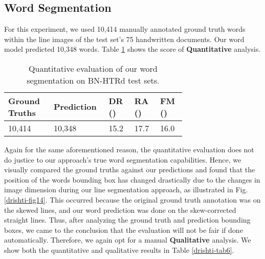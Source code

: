 \documentclass[runningheads]{llncs}
\begin{document}
\subsection{Word Segmentation} 
For this experiment, we used 10,414 manually annotated ground truth words within the line images of the test set's 75 handwritten documents. Our word model predicted 10,348 words. Table \ref{drishti-tab5} shows the score of \textbf{Quantitative} analysis.

\begin{table}[h]
\vspace{-4mm}
\centering
\caption{Quantitative evaluation of our word segmentation on BN-HTRd test sets.}\label{drishti-tab5}
\vspace{-1mm}
\begin{tabular}{|p{0.21\linewidth}|p{0.15\linewidth}|p{0.11\linewidth}| p{0.11\linewidth}| p{0.11\linewidth}|}
\hline
\textbf{Ground Truths} & \textbf{Prediction} & \textbf{DR ()} & \textbf{RA ()} & \textbf{FM ()}\\
\hline
10,414 & 10,348 & 15.2 & 17.7 & 16.0\\
\hline
\end{tabular}
\vspace{-5mm}
\end{table}



\noindent Again for the same aforementioned reason, the quantitative evaluation does not do justice to our approach's true word segmentation capabilities. Hence, we visually compared the ground truths against our predictions and found that the position of the words bounding box has changed drastically due to the changes in image dimension during our line segmentation approach, as illustrated in Fig. \ref{drishti-fig14}. This occurred because the original ground truth annotation was on the skewed lines, and our word prediction was done on the skew-corrected straight lines. Thus, after analyzing the ground truth and prediction bounding boxes, we came to the conclusion that the evaluation will not be fair if done automatically. Therefore, we again opt for a manual \textbf{Qualitative} analysis. We show both the quantitative and qualitative results in Table \ref{drishti-tab6}.
\end{document}
